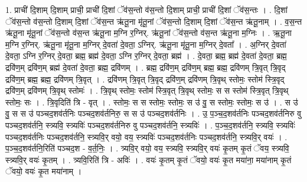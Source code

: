 \documentclass[17pt]{extarticle}
\begin{document}
1. प्राची॑ दि॒शाम् दि॒शाम् प्राची॒ प्राची॑ दि॒शां ॅव॑स॒न्तो व॑स॒न्तो दि॒शाम् प्राची॒ प्राची॑ दि॒शां ॅव॑स॒न्तः । . दि॒शां ॅव॑स॒न्तो व॑स॒न्तो दि॒शाम् दि॒शां ॅव॑स॒न्त ऋ॑तू॒ना मृ॑तू॒नां ॅव॑स॒न्तो दि॒शाम् दि॒शां ॅव॑स॒न्त ऋ॑तू॒नाम् । . व॒स॒न्त ऋ॑तू॒ना मृ॑तू॒नां ॅव॑स॒न्तो व॑स॒न्त ऋ॑तू॒ना म॒ग्नि र॒ग्निर्. ऋ॑तू॒नां ॅव॑स॒न्तो व॑स॒न्त ऋ॑तू॒ना म॒ग्निः । . ऋ॒तू॒ना म॒ग्नि र॒ग्निर्. ऋ॑तू॒ना मृ॑तू॒ना म॒ग्निर् दे॒वता॑ दे॒वता॒ ऽग्निर्. ऋ॑तू॒ना मृ॑तू॒ना म॒ग्निर् दे॒वता᳚ । . अ॒ग्निर् दे॒वता॑ दे॒वता॒ ऽग्नि र॒ग्निर् दे॒वता॒ ब्रह्म॒ ब्रह्म॑ दे॒वता॒ ऽग्नि र॒ग्निर् दे॒वता॒ ब्रह्म॑ । . दे॒वता॒ ब्रह्म॒ ब्रह्म॑ दे॒वता॑ दे॒वता॒ ब्रह्म॒ द्रवि॑ण॒म् द्रवि॑ण॒म् ब्रह्म॑ दे॒वता॑ दे॒वता॒ ब्रह्म॒ द्रवि॑णम् । . ब्रह्म॒ द्रवि॑ण॒म् द्रवि॑ण॒म् ब्रह्म॒ ब्रह्म॒ द्रवि॑णम् त्रि॒वृत् त्रि॒वृद् द्रवि॑ण॒म् ब्रह्म॒ ब्रह्म॒ द्रवि॑णम् त्रि॒वृत् । . द्रवि॑णम् त्रि॒वृत् त्रि॒वृद् द्रवि॑ण॒म् द्रवि॑णम् त्रि॒वृथ् स्तोमः॒ स्तोम॑ स्त्रि॒वृद् द्रवि॑ण॒म् द्रवि॑णम् त्रि॒वृथ् स्तोमः॑ । . त्रि॒वृथ् स्तोमः॒ स्तोम॑ स्त्रि॒वृत् त्रि॒वृथ् स्तोमः॒ स स स्तोम॑ स्त्रि॒वृत् त्रि॒वृथ् स्तोमः॒ सः । . त्रि॒वृदिति॑ त्रि - वृत् । . स्तोमः॒ स स स्तोमः॒ स्तोमः॒ स उ॑ वु॒ स स्तोमः॒ स्तोमः॒ स उ॑ । . स उ॑  वु॒ स स उ॑ पञ्चद॒शव॑र्तनिः पञ्चद॒शव॑र्तनिरु॒ स स उ॑ पञ्चद॒शव॑र्तनिः । . उ॒ प॒ञ्च॒द॒शव॑र्तनिः पञ्चद॒शव॑र्तनिरु वु पञ्चद॒शव॑र्तनि॒ स्त्र्यवि॒ स्त्र्यविः॑ पञ्चद॒शव॑र्तनिरु वु पञ्चद॒शव॑र्तनि॒ स्त्र्यविः॑ । . प॒ञ्च॒द॒शव॑र्तनि॒ स्त्र्यवि॒ स्त्र्यविः॑ पञ्चद॒शव॑र्तनिः पञ्चद॒शव॑र्तनि॒ स्त्र्यवि॒र् वयो॒ वय॒ स्त्र्यविः॑ पञ्चद॒शव॑र्तनिः पञ्चद॒शव॑र्तनि॒ स्त्र्यवि॒र् वयः॑ । . प॒ञ्च॒द॒शव॑र्तनि॒रिति॑ पञ्चद॒श - व॒र्त॒निः॒ । . त्र्यवि॒र् वयो॒ वय॒ स्त्र्यवि॒ स्त्र्यवि॒र् वयः॑ कृ॒तम् कृ॒तं ॅवय॒ स्त्र्यवि॒ स्त्र्यवि॒र् वयः॑ कृ॒तम् । . त्र्यवि॒रिति॑ त्रि - अविः॑ । . वयः॑ कृ॒तम् कृ॒तं ॅवयो॒ वयः॑ कृ॒त मया॑ना॒ मया॑नाम् कृ॒तं ॅवयो॒ वयः॑ कृ॒त मया॑नाम् । \newline
\end{document}
